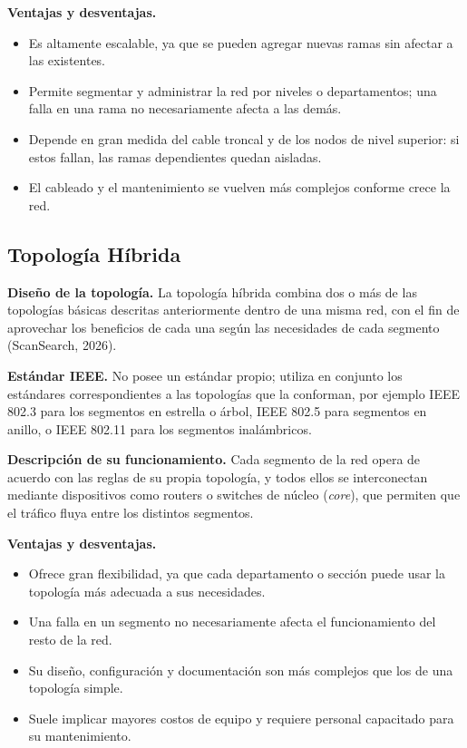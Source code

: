 \documentclass[12pt,letterpaper]{article}
\begin{document}
\textbf{Ventajas y desventajas.}
\begin{itemize}[nosep]
    \item[+] Es altamente escalable, ya que se pueden agregar nuevas ramas sin afectar a las existentes.
    \item[+] Permite segmentar y administrar la red por niveles o departamentos; una falla en una rama no necesariamente afecta a las demás.
    \item[$-$] Depende en gran medida del cable troncal y de los nodos de nivel superior: si estos fallan, las ramas dependientes quedan aisladas.
    \item[$-$] El cableado y el mantenimiento se vuelven más complejos conforme crece la red.
\end{itemize}

\subsection{Topología Híbrida}

\textbf{Diseño de la topología.} La topología híbrida combina dos o más de las topologías básicas descritas anteriormente dentro de una misma red, con el fin de aprovechar los beneficios de cada una según las necesidades de cada segmento (ScanSearch, 2026).

\textbf{Estándar IEEE.} No posee un estándar propio; utiliza en conjunto los estándares correspondientes a las topologías que la conforman, por ejemplo IEEE 802.3 para los segmentos en estrella o árbol, IEEE 802.5 para segmentos en anillo, o IEEE 802.11 para los segmentos inalámbricos.

\textbf{Descripción de su funcionamiento.} Cada segmento de la red opera de acuerdo con las reglas de su propia topología, y todos ellos se interconectan mediante dispositivos como routers o switches de núcleo (\textit{core}), que permiten que el tráfico fluya entre los distintos segmentos.

\textbf{Ventajas y desventajas.}
\begin{itemize}[nosep]
    \item[+] Ofrece gran flexibilidad, ya que cada departamento o sección puede usar la topología más adecuada a sus necesidades.
    \item[+] Una falla en un segmento no necesariamente afecta el funcionamiento del resto de la red.
    \item[$-$] Su diseño, configuración y documentación son más complejos que los de una topología simple.
    \item[$-$] Suele implicar mayores costos de equipo y requiere personal capacitado para su mantenimiento.
\end{itemize}
\end{document}
